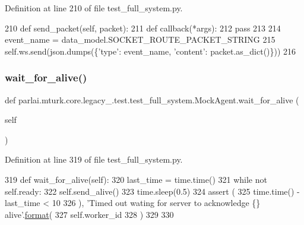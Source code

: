 Definition at line 210 of file test\+\_\+full\+\_\+system.\+py.


\begin{DoxyCode}
210     \textcolor{keyword}{def }send\_packet(self, packet):
211         \textcolor{keyword}{def }callback(*args):
212             \textcolor{keywordflow}{pass}
213 
214         event\_name = data\_model.SOCKET\_ROUTE\_PACKET\_STRING
215         self.ws.send(json.dumps(\{\textcolor{stringliteral}{'type'}: event\_name, \textcolor{stringliteral}{'content'}: packet.as\_dict()\}))
216 
\end{DoxyCode}
\mbox{\label{classparlai_1_1mturk_1_1core_1_1legacy__2018_1_1test_1_1test__full__system_1_1MockAgent_a7a7a7110be3ed9726d8185f6ddb7cdef}} 
\subsubsection{\texorpdfstring{wait\+\_\+for\+\_\+alive()}{wait\_for\_alive()}}
{\footnotesize\ttfamily def parlai.\+mturk.\+core.\+legacy\+\_.\+test.\+test\+\_\+full\+\_\+system.\+Mock\+Agent.\+wait\+\_\+for\+\_\+alive (\begin{DoxyParamCaption}\item[{}]{self }\end{DoxyParamCaption})}



Definition at line 319 of file test\+\_\+full\+\_\+system.\+py.


\begin{DoxyCode}
319     \textcolor{keyword}{def }wait\_for\_alive(self):
320         last\_time = time.time()
321         \textcolor{keywordflow}{while} \textcolor{keywordflow}{not} self.ready:
322             self.send\_alive()
323             time.sleep(0.5)
324             \textcolor{keyword}{assert} (
325                 time.time() - last\_time < 10
326             ), \textcolor{stringliteral}{'Timed out wating for server to acknowledge \{\} alive'}.\hyperlink{namespaceparlai_1_1chat__service_1_1services_1_1messenger_1_1shared__utils_a32e2e2022b824fbaf80c747160b52a76}{format}(
327                 self.worker\_id
328             )
329 
330 
\end{DoxyCode}


